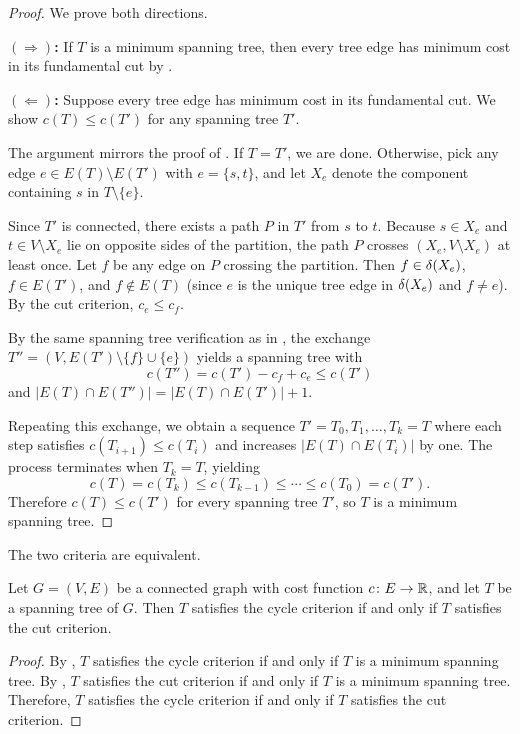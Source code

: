 \begin{proof}
We prove both directions.

\textbf{$(\Rightarrow)$:}
If $T$ is a minimum spanning tree, then every tree edge has minimum cost in its fundamental cut by .

\textbf{$(\Leftarrow)$:}
Suppose every tree edge has minimum cost in its fundamental cut.
We show $c(T) \leq c(T')$ for any spanning tree $T'$.

The argument mirrors the proof of .
If $T = T'$, we are done.
Otherwise, pick any edge $e \in E(T) \setminus E(T')$ with $e = \{s, t\}$, and let $X_e$ denote the component containing $s$ in $T \setminus \{e\}$.

Since $T'$ is connected, there exists a path $P$ in $T'$ from $s$ to $t$.
Because $s \in X_e$ and $t \in V \setminus X_e$ lie on opposite sides of the partition, the path $P$ crosses $(X_e, V \setminus X_e)$ at least once.
Let $f$ be any edge on $P$ crossing the partition.
Then $f \in \delta(X_e)$, $f \in E(T')$, and $f \notin E(T)$ (since $e$ is the unique tree edge in $\delta(X_e)$ and $f \neq e$).
By the cut criterion, $c_e \leq c_f$.

By the same spanning tree verification as in , the exchange $T'' = (V, E(T') \setminus \{f\} \cup \{e\})$ yields a spanning tree with
\[
c(T'') = c(T') - c_f + c_e \leq c(T')
\]
and $|E(T) \cap E(T'')| = |E(T) \cap E(T')| + 1$.

Repeating this exchange, we obtain a sequence $T' = T_0, T_1, \ldots, T_k = T$ where each step satisfies $c(T_{i+1}) \leq c(T_i)$ and increases $|E(T) \cap E(T_i)|$ by one.
The process terminates when $T_k = T$, yielding
\[
c(T) = c(T_k) \leq c(T_{k-1}) \leq \cdots \leq c(T_0) = c(T').
\]
Therefore $c(T) \leq c(T')$ for every spanning tree $T'$, so $T$ is a minimum spanning tree.
\end{proof}

The two criteria are equivalent.

\begin{theorem}\label{thm:mst-equivalence}
Let $G = (V, E)$ be a connected graph with cost function $c \colon E \to \mathbb{R}$, and let $T$ be a spanning tree of $G$.
Then $T$ satisfies the cycle criterion if and only if $T$ satisfies the cut criterion.
\end{theorem}

\begin{proof}
By , $T$ satisfies the cycle criterion if and only if $T$ is a minimum spanning tree.
By , $T$ satisfies the cut criterion if and only if $T$ is a minimum spanning tree.
Therefore, $T$ satisfies the cycle criterion if and only if $T$ satisfies the cut criterion.
\end{proof}

